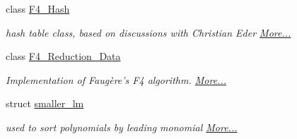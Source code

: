 \begin{DoxyCompactItemize}
class \hyperlink{group___g_b_computation_class_f4___hash}{F4\+\_\+\+Hash}
\begin{DoxyCompactList}\small\item\em hash table class, based on discussions with Christian Eder  \hyperlink{group___g_b_computation_class_f4___hash}{More...}\end{DoxyCompactList}\item 
class \hyperlink{group___g_b_computation_class_f4___reduction___data}{F4\+\_\+\+Reduction\+\_\+\+Data}
\begin{DoxyCompactList}\small\item\em Implementation of Faug\`{e}re's F4 algorithm.  \hyperlink{group___g_b_computation_class_f4___reduction___data}{More...}\end{DoxyCompactList}\item 
struct \hyperlink{group___g_b_computation_structsmaller__lm}{smaller\+\_\+lm}
\begin{DoxyCompactList}\small\item\em used to sort polynomials by leading monomial  \hyperlink{group___g_b_computation_structsmaller__lm}{More...}\end{DoxyCompactList}\end{DoxyCompactItemize}
